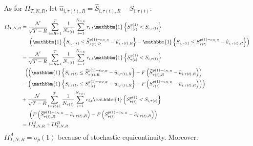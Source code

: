 \noindent
As for $II_{T,N,R}$, let $\widehat{u}_{i,\tau(t),R}=\widehat{S}_{i,\tau(t),R}-S_{i,\tau(t) }$:
\begin{align}
II_{T,N,R} &= \frac{\mathcal{N}}{\sqrt{T-R}}\sum_{t=R+1}^{T}\frac{1}{N_{\tau(t)}} \sum_{i=1}^{N_{\tau(t)}} r_{i,t} \mathbbm{1} \left\{ S_{\tau(t)}^{p(1)} < S_{i,\tau(t) } \right\} \\
& \hspace{0.5cm} \left( \mathbbm{1} \left\{ S_{i,\tau(t) }\leq \widehat{S}_{\tau(t),R}^{p(1)-c_{N,R}}-\widehat{u}_{i,\tau(t),R}\right\} -\mathbbm{1} \left\{ S_{i,\tau(t) }\leq S_{\tau(t)}^{p(1)-c_{N,R}}-\widehat{u}_{i,\tau(t),R} \right\} \right) \notag \\
&= \frac{\mathcal{N}}{\sqrt{T-R}}\sum_{t=R+1}^{T}\frac{1}{N_{\tau(t)}}\sum_{i=1}^{N_{\tau(t)}} r_{i,t}  \mathbbm{1} \left\{ S_{\tau(t)}^{p(1)} < S_{i,\tau(t) } \right\} \notag \\
& \hspace{0.2cm} \left( \left( \mathbbm{1} \left\{ S_{i,\tau(t) } \leq \widehat{S}_{\tau(t),R}^{p(1)-c_{N,R}}-\widehat{u}_{i,\tau(t),R}\right\} -F\left( \widehat{S}_{\tau(t),R}^{p(1)-c_{N,R}}-\widehat{u}_{i,\tau(t),R}\right) \right) \right. \notag \\
& -\left. \left( \mathbbm{1} \left\{ S_{i,\tau(t) }\leq S_{\tau(t) }^{p(1)-c_{N,R}}-\widehat{u}_{i,\tau(t),R}\right\} -F\left( S_{\tau(t)}^{p(1)-c_{N,R}}-\widehat{u}_{i,\tau(t),R}\right) \right) \right) \notag \\
& + \frac{\mathcal{N}}{\sqrt{T-R}}\sum_{t=R+1}^{T}\frac{1}{N_{\tau(t)}}\sum_{i=1}^{N_{\tau(t)}}r_{i,t}  \mathbbm{1} \left\{ S_{\tau(t)}^{p(1)} < S_{i,\tau(t) } \right\} \notag \\
& \hspace{0.5cm} \left( F\left( \widehat{S}_{\tau(t),R}^{p(1)-c_{N,R}}-\widehat{u}_{i,\tau(t),R}\right) -F\left( S_{\tau(t) }^{p(1)-c_{N,R}}-\widehat{u}_{i,\tau(t),R}\right) \right) \notag \\
&= II^A_{T,N,R} + II^B_{T,N,R} \notag
\end{align}
$II_{T,N,R}^{A}=o_{p}(1)$ because of stochastic equicontinuity. Moreover:
